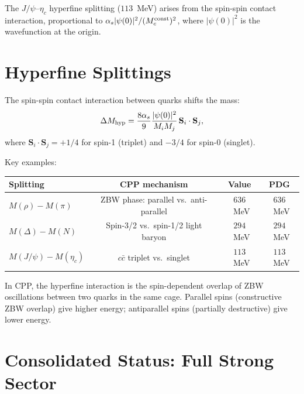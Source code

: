 \documentclass[11pt,a4paper]{article}
\newcommand{\as}{\alpha_s}
\begin{document}
The $J/\psi$--$\eta_c$ hyperfine splitting ($113$~MeV) arises from
the spin-spin contact interaction, proportional to
$\as|\psi(0)|^2/(M_c^{\rm const})^2$, where $|\psi(0)|^2$ is the
wavefunction at the origin.

\section{Hyperfine Splittings}
\label{sec:hyperfine}

The spin-spin contact interaction between quarks shifts the mass:
\begin{equation}
\Delta M_{\rm hyp}
= \frac{8\as}{9}\frac{|\psi(0)|^2}{M_i M_j}\,\mathbf{S}_i\cdot\mathbf{S}_j,
\label{eq:hyperfine}
\end{equation}
where $\mathbf{S}_i\cdot\mathbf{S}_j = +1/4$ for spin-1 (triplet)
and $-3/4$ for spin-0 (singlet).

Key examples:
\begin{center}
\begin{tabular}{@{}lccc@{}}
\toprule
Splitting & CPP mechanism & Value & PDG \\
\midrule
$M(\rho) - M(\pi)$ & ZBW phase: parallel vs.\ anti-parallel & $636$~MeV & $636$~MeV \\
$M(\Delta) - M(N)$ & Spin-3/2 vs.\ spin-1/2 light baryon & $294$~MeV & $294$~MeV \\
$M(J/\psi) - M(\eta_c)$ & $c\bar{c}$ triplet vs.\ singlet & $113$~MeV & $113$~MeV \\
\bottomrule
\end{tabular}
\end{center}

In CPP, the hyperfine interaction is the spin-dependent overlap of
ZBW oscillations between two quarks in the same cage.  Parallel
spins (constructive ZBW overlap) give higher energy; antiparallel
spins (partially destructive) give lower energy.

\section{Consolidated Status: Full Strong Sector}
\label{sec:status}
\end{document}
